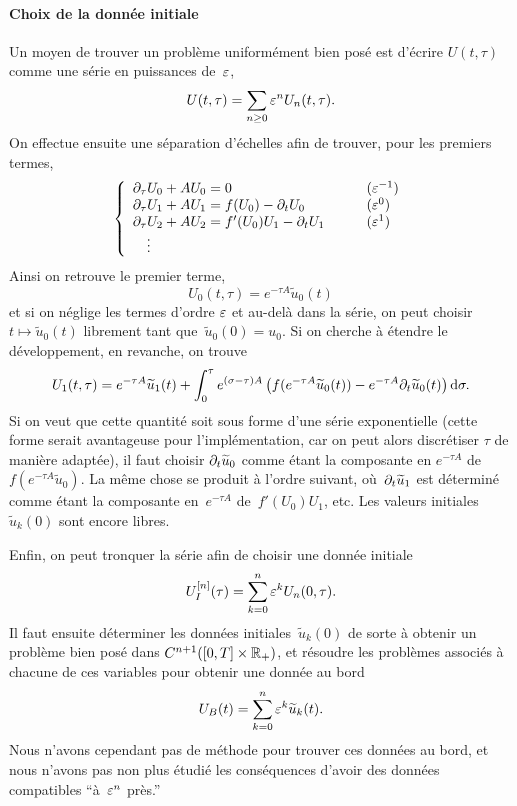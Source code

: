 \paragraph{Choix de la donnée initiale\\}
Un moyen de trouver un problème uniformément bien posé est d'écrire $U(t,\tau)$ comme une série en puissances de~$\varepsilon$, 
\begin{equation*}
    U(t,\tau) = \sum_{n \geq 0} \varepsilon^n U_n (t,\tau) .
\end{equation*}
On effectue ensuite une séparation d'échelles afin de trouver, pour les premiers termes, 
\begin{equation*}
    \left\{\begin{array}{ll}
        \partial_\tau U_0 + A U_0 = 0 & (\varepsilon^{-1}) \\
        \partial_\tau U_1 + AU_1 = f(U_0) - \partial_t U_0 
        & (\varepsilon^0) \\
        \partial_\tau U_2 + AU_2 = f'(U_0)U_1 - \partial_t U_1
        \qquad
        & (\varepsilon^1) \\
        \quad\vdots
    \end{array}\right.
\end{equation*}
Ainsi on retrouve le premier terme,
\begin{equation*}
    U_0(t,\tau) = e^{-\tau A} \widetilde{u}_0(t)
\end{equation*}
et si on néglige les termes d'ordre $\varepsilon$ et au-delà dans la série, on peut choisir $t \mapsto \tilde{u}_0(t)$ librement tant que~$\tilde{u}_0(0) = u_0$. Si on cherche à étendre le développement, en revanche, on trouve 
\begin{equation*}
    U_1(t,\tau) = e^{-\tau A} \widetilde{u}_1(t)
    + \int_0^{\tau} e^{(\sigma-\tau)A} \left(
        f(e^{-\tau A}\widetilde{u}_0(t)) - e^{-\tau A} \partial_t \widetilde{u}_0(t) 
    \right) \mathrm{d} \sigma .
\end{equation*}
Si on veut que cette quantité soit sous forme d'une série exponentielle (cette forme serait avantageuse pour l'implémentation, car on peut alors discrétiser $\tau$ de manière adaptée), il faut choisir $\partial_t \widetilde{u}_0$ comme étant la composante en $e^{-\tau A}$ de $f(e^{-\tau A}\widetilde{u}_0)$. La même chose se produit à l'ordre suivant, où~$\partial_t \widetilde{u}_1$ est déterminé comme étant la composante en~$e^{-\tau A}$ de~$f'(U_0)U_1$, etc. Les valeurs initiales~$\widetilde{u}_k(0)$ sont encore libres.

Enfin, on peut tronquer la série afin de choisir une donnée initiale 
\begin{equation*}
    U_I^{[n]}(\tau) = \sum_{k=0}^n \varepsilon^k U_n(0,\tau) .
\end{equation*}
Il faut ensuite déterminer les données initiales~$\widetilde{u}_k(0)$ de sorte à obtenir un problème bien posé dans $C^{n+1}([0,T] \times \mathbb{R}_+)$, et résoudre les problèmes associés à chacune de ces variables pour obtenir une donnée au bord 
\begin{equation*}
    U_B(t) = \sum_{k = 0}^n \varepsilon^k \widetilde{u}_k(t) .
\end{equation*}
Nous n'avons cependant pas de méthode pour trouver ces données au bord, et nous n'avons pas non plus étudié les conséquences d'avoir des données compatibles \enquote{à~$\varepsilon^{n}$ près.}

